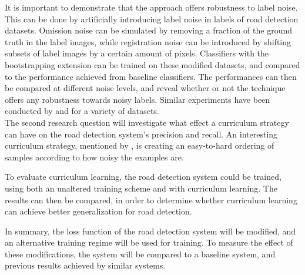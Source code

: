 It is important to demonstrate that the approach offers robustness to label noise. This can be done by artificially introducing label noise in labels of road detection datasets. Omission noise can be simulated by removing a fraction of the ground truth in the label images, while registration noise can be introduced by shifting subsets of label images by a certain amount of pixels. Classifiers with the bootstrapping extension can be trained on these modified datasets, and compared to the performance achieved from baseline classifiers. The performances can then be compared at different noise levels, and reveal whether or not the technique offers any robustness towards noisy labels. Similar experiments have been conducted by \citep{Sukhbaatar_noisy_network_learning} and \citep{Reed_noisy_labels_bootstrapping} for a variety of datasets. \\

The second research question will investigate what effect a curriculum strategy can have on the road detection system's precision and recall. An interesting curriculum strategy, mentioned by \cite{Bengio_curriculumlearning}, is creating an easy-to-hard ordering of samples according to how noisy the examples are.

To evaluate curriculum learning, the road detection system could be trained, using both an unaltered training scheme and with curriculum learning. The results can then be compared, in order to determine whether curriculum learning can achieve better generalization for road detection.\\


In summary, the loss function of the road detection system will be modified, and an alternative training regime will be used for training. To measure the effect of these modifications, the system will be compared to a baseline system, and previous results achieved by similar systems.